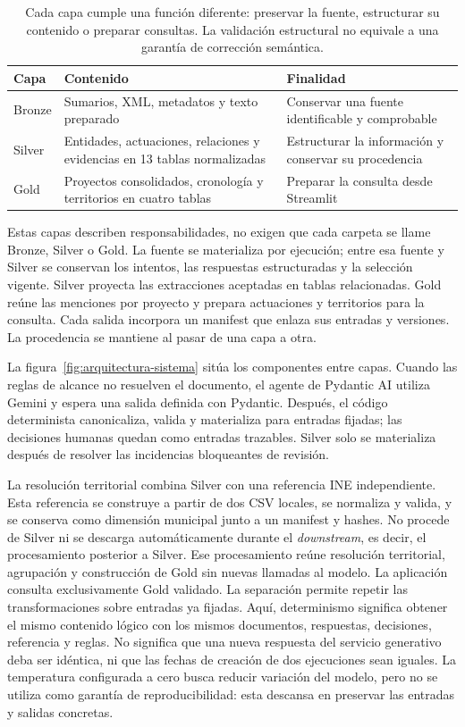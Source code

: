 \begin{table}[htbp]
\centering
\small
\renewcommand{\arraystretch}{1.2}
\begin{tabular}{L{1.5cm} L{6.0cm} L{5.0cm}}
\hline
Capa & Contenido & Finalidad \\
\hline
Bronze & Sumarios, XML, metadatos y texto preparado & Conservar una fuente identificable y comprobable \\
Silver & Entidades, actuaciones, relaciones y evidencias en 13 tablas normalizadas & Estructurar la información y conservar su procedencia \\
Gold & Proyectos consolidados, cronología y territorios en cuatro tablas & Preparar la consulta desde Streamlit \\
\hline
\end{tabular}
\caption[Capas de datos]{Cada capa cumple una función diferente: preservar
la fuente, estructurar su contenido o preparar consultas. La validación
estructural no equivale a una garantía de corrección semántica.}
\label{tab:capas}
\end{table}

Estas capas describen responsabilidades, no exigen que cada carpeta se llame
Bronze, Silver o Gold. La fuente se materializa por ejecución; entre esa fuente
y Silver se conservan los intentos, las respuestas estructuradas y la selección
vigente. Silver proyecta las extracciones aceptadas en tablas relacionadas.
Gold reúne las menciones por proyecto y prepara actuaciones y territorios
para la consulta. Cada salida incorpora un manifest que enlaza sus entradas
y versiones. La procedencia se mantiene al pasar de una capa a otra.

La figura~\ref{fig:arquitectura-sistema} sitúa los componentes entre capas.
Cuando las reglas de alcance no resuelven el documento, el agente de Pydantic
AI utiliza Gemini y espera una salida definida con Pydantic. Después, el código
determinista canonicaliza, valida y materializa para entradas fijadas; las
decisiones humanas quedan como entradas trazables. Silver solo se materializa
después de resolver las incidencias bloqueantes de revisión.

La resolución territorial combina Silver con una referencia INE independiente.
Esta referencia se construye a partir de dos CSV locales, se normaliza y
valida, y se conserva como dimensión municipal junto a un manifest y hashes.
No procede de Silver ni se descarga automáticamente durante el
\emph{downstream},
es decir, el procesamiento posterior a Silver. Ese procesamiento reúne
resolución territorial, agrupación y construcción de Gold sin nuevas llamadas
al modelo. La aplicación consulta exclusivamente Gold validado.
La separación permite repetir las transformaciones sobre entradas ya fijadas.
Aquí, determinismo significa obtener el mismo contenido lógico con los mismos
documentos, respuestas, decisiones, referencia y reglas. No significa que una
nueva respuesta del servicio generativo deba ser idéntica, ni que las fechas
de creación de dos ejecuciones sean iguales. La temperatura configurada a
cero busca reducir variación del modelo, pero no se utiliza como garantía de
reproducibilidad: esta descansa en preservar las entradas y salidas concretas.

